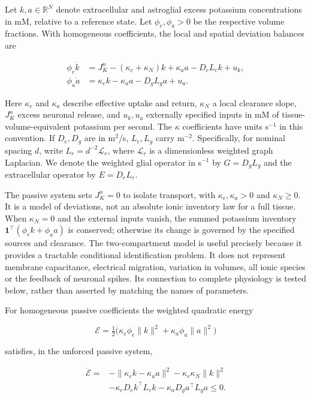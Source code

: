 \documentclass[
  11pt,
]{article}
\begin{document}
Let \(k,a\in\mathbb R^N\) denote extracellular and astroglial excess
potassium concentrations in mM, relative to a reference state. Let
\(\phi_e,\phi_a>0\) be the respective volume fractions. With homogeneous
coefficients, the local and spatial deviation balances are

\[\begin{aligned}
\phi_e\dot k &= J_K^n-(\kappa_e+\kappa_N)k+\kappa_a a-D_eL_e k+u_k,\\
\phi_a\dot a &= \kappa_e k-\kappa_a a-D_gL_g a+u_a .
\end{aligned}\]

Here \(\kappa_e\) and \(\kappa_a\) describe effective uptake and return,
\(\kappa_N\) a local clearance slope, \(J_K^n\) excess neuronal release,
and \(u_k,u_a\) externally specified inputs in mM of
tissue-volume-equivalent potassium per second. The \(\kappa\)
coefficients have units s\(^{-1}\) in this convention. If \(D_e,D_g\)
are in m\(^2\)/s, \(L_e,L_g\) carry m\(^{-2}\). Specifically, for
nominal spacing \(d\), write \(L_r=d^{-2}\mathcal L_r\), where
\(\mathcal L_r\) is a dimensionless weighted graph Laplacian. We denote
the weighted glial operator in s\(^{-1}\) by \(G=D_gL_g\) and the
extracellular operator by \(E=D_eL_e\).

The passive system sets \(J_K^n=0\) to isolate transport, with
\(\kappa_e,\kappa_a>0\) and \(\kappa_N\geq0\). It is a model of
deviations, not an absolute ionic inventory law for a full tissue. When
\(\kappa_N=0\) and the external inputs vanish, the summed potassium
inventory \(\mathbf1^\top(\phi_e k+\phi_a a)\) is conserved; otherwise
its change is governed by the specified sources and clearance. The
two-compartment model is useful precisely because it provides a
tractable conditional identification problem. It does not represent
membrane capacitance, electrical migration, variation in volumes, all
ionic species or the feedback of neuronal spikes. Its connection to
complete physiology is tested below, rather than asserted by matching
the names of parameters.

For homogeneous passive coefficients the weighted quadratic energy

\[\mathcal E=\tfrac12\big(\kappa_e\phi_e\|k\|^2+\kappa_a\phi_a\|a\|^2\big)\]

satisfies, in the unforced passive system,

\[\begin{aligned}
\dot{\mathcal E}={}&-\|\kappa_e k-\kappa_a a\|^2-\kappa_e\kappa_N\|k\|^2\\
&-\kappa_e D_e k^\top L_e k-\kappa_a D_g a^\top L_g a\le0 .
\end{aligned}\]
\end{document}
